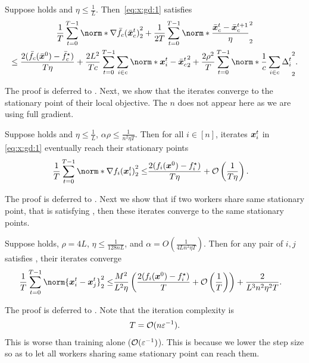 \documentclass{article}
\begin{document}
\begin{lemma}\label{lemma:sd:1}
  Suppose  holds and $\eta\le\frac{1}{L}$. Then~\eqref{eq:x:gd:1} satisfies
  \begin{multline*}
    \frac{1}{T} \sum_{t=0}^{T-1} \norm*{\nabla \bar{f}_c(\bar{\xx}_c^t)}_2^2
    + \frac{1}{2T} \sum_{t=0}^{T-1} \norm*{\frac{\bar{\xx}_c^{t} - \bar{\xx}_c^{t+1}}{\eta}}_2^2 \\
    \le \frac{2(\bar{f}_c(\bar{\xx}^{0}) - \bar{f}_c^\star)}{T\eta}
    + \frac{2L^2}{Tc} \sum_{t=0}^{T-1}  \sum_{i\in c} \norm*{\xx^t_i
    - \bar{\xx}_c^t}_2^2
    + \frac{2\rho^2}{T} \sum_{t=0}^{T-1} \norm*{\frac{1}{c}\sum_{i\in c} \Delta_i^t}_2^2 .
  \end{multline*}
\end{lemma}
The proof is deferred to . Next, we show that the iterates converge to the stationary point of their local objective. The $n$ does not appear here as we are using full gradient.
\begin{theorem}\label{th:convergence}
  Suppose  holds and $\eta\le\frac{1}{L}$,  $\alpha\rho\le\frac{1}{n^2\eta T}$. Then for all $i\in[n]$, iterates $\bm{x}_i^t$ in \eqref{eq:x:gd:1} eventually reach their stationary points
  \begin{align*}
    \frac{1}{T}\sum_{t=0}^{T-1} \norm*{\nabla f_i(\xx_i^t)}_2^2
    \le& \frac{2(f_i(\xx^{0}) - f_i^\star)}{T\eta} + \cO\left(\frac{1}{T\eta}\right).
  \end{align*}
\end{theorem}
The proof is deferred to .
Next we show that if two workers share same stationary point, that is satisfying , then these iterates converge to the same stationary points.
\begin{theorem}\label{th:consensus-distance:2}
  Suppose  holds, $\rho=4L$, $\eta\le\frac{1}{128nL}$, and $\alpha=O(\frac{1}{4Ln^2\eta T})$. Then for any pair of $i,j$ satisfies , their iterates converge
  \begin{align*}
    \frac{1}{T} \sum_{t=0}^{T-1} \norm{\xx_i^{t} - \xx_j^{t}}_2^2
    \le& \frac{M^2}{L^2\eta}\left( \frac{2(f_i(\xx^{0}) - f_i^\star)}{T} + \cO\left(\frac{1}{T}\right) \right)
    + \frac{2}{L^3n^2\eta^2 T}.
  \end{align*}
\end{theorem}
The proof is deferred to . Note that the iteration complexity is
\begin{align*}
  T=\mathcal{O}(n\varepsilon^{-1}).
\end{align*}
This is worse than training alone ($\mathcal{O}(\varepsilon^{-1})$). This is because we lower the step size so as to let all workers sharing same stationary point can reach them.
\end{document}

